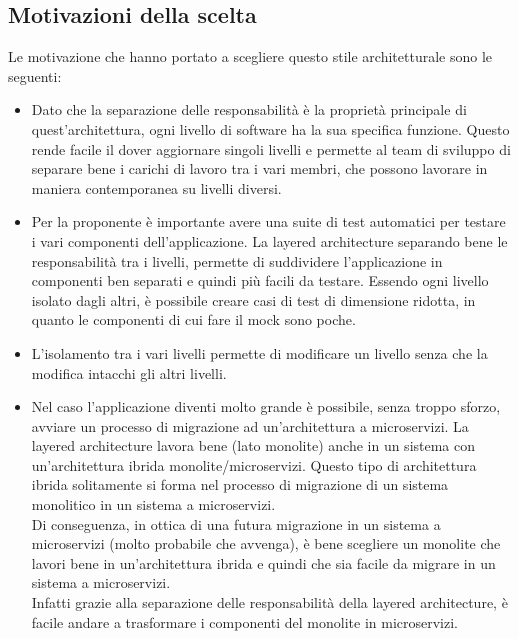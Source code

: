\subsection{Motivazioni della scelta}
Le motivazione che hanno portato a scegliere questo stile architetturale sono le seguenti:
\begin{itemize}
    \item Dato che la separazione delle responsabilità è la proprietà principale di quest'architettura,
        ogni livello di software ha la sua specifica funzione. Questo rende facile il dover aggiornare 
        singoli livelli e permette al team di sviluppo di separare bene i carichi di lavoro tra i vari 
        membri, che possono lavorare in maniera contemporanea su livelli diversi.
    \item Per la proponente è importante avere una suite di test automatici per testare i vari componenti
        dell'applicazione. La layered architecture separando bene le responsabilità tra i livelli, 
        permette di suddividere l'applicazione in componenti ben separati e quindi più facili da testare.
        Essendo ogni livello isolato dagli altri, è possibile creare casi di test di dimensione ridotta, 
        in quanto le componenti di cui fare il \gls{mock} sono poche.
    \item L'isolamento tra i vari livelli permette di modificare un livello senza che la modifica intacchi
        gli altri livelli.
    \item Nel caso l'applicazione diventi molto grande è possibile, senza troppo sforzo, avviare un processo
        di migrazione ad un'architettura a microservizi. La layered architecture lavora bene (lato monolite) anche
        in un sistema con un'architettura ibrida monolite/microservizi. Questo tipo di architettura
        ibrida solitamente si forma nel processo di migrazione di un sistema monolitico in un sistema a microservizi.
        \\
        Di conseguenza, in ottica di una futura migrazione in un sistema a microservizi (molto probabile che avvenga), è
        bene scegliere un monolite che lavori bene in un'architettura ibrida e quindi che sia facile da migrare
        in un sistema a microservizi.
        \\
        Infatti grazie alla separazione delle responsabilità della layered architecture, è facile andare
        a trasformare i componenti del monolite in microservizi.
\end{itemize}
\clearpage
